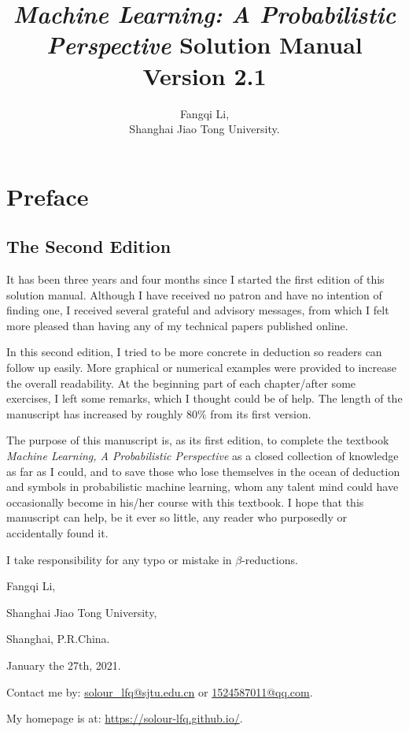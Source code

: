 \documentclass[UTF8]{ctexart}
\begin{document}
\title{\emph{Machine Learning: A Probabilistic Perspective} Solution Manual Version 2.1}
\author{Fangqi Li,\\ Shanghai Jiao Tong University.}
\date{}
\maketitle
\tableofcontents
\newpage
\section{Preface}
\subsection{The Second Edition}
It has been three years and four months since I started the first edition of this solution manual.
Although I have received no patron and have no intention of finding one, I received several grateful and advisory messages, from which I felt more pleased than having any of my technical papers published online.

In this second edition, I tried to be more concrete in deduction so readers can follow up easily.
More graphical or numerical examples were provided to increase the overall readability.
At the beginning part of each chapter/after some exercises, I left some remarks, which I thought could be of help.
The length of the manuscript has increased by roughly 80\% from its first version.  

The purpose of this manuscript is, as its first edition, to complete the textbook \emph{Machine Learning, A Probabilistic Perspective} as a closed collection of knowledge as far as I could, and to save those who lose themselves in the ocean of deduction and symbols in probabilistic machine learning, whom any talent mind could have occasionally become in his/her course with this textbook.
I hope that this manuscript can help, be it ever so little, any reader who purposedly or accidentally found it.

I take responsibility for any typo or mistake in $\beta$-reductions.

Fangqi Li,

Shanghai Jiao Tong University,

Shanghai, P.R.China.

January the 27th, 2021.

Contact me by: \url{solour_lfq@sjtu.edu.cn} or \url{1524587011@qq.com}.

My homepage is at: \url{https://solour-lfq.github.io/}.
\end{document}
